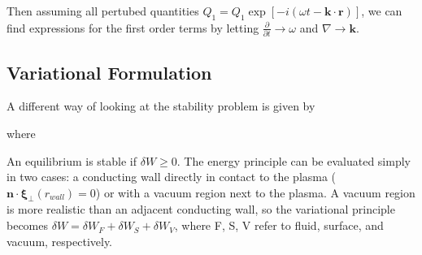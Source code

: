 \noindent Then assuming all pertubed quantities $Q_{1} = Q_{1} \exp \left[- i \left( \omega t - \textbf{k} \cdot \textbf{r} \right) \right]$, we can find expressions for the first order terms by letting $\frac{\partial}{\partial t} \rightarrow \omega $ and $\nabla \rightarrow \textbf{k}$. 

\subsection{Variational Formulation}

\noindent A different way of looking at the stability problem is given by 


\noindent where


\noindent An equilibrium is stable if $\delta W \geq 0$. The energy principle can be evaluated simply in two cases: a conducting wall directly in contact to the plasma ($\textbf{n} \cdot \boldsymbol{\xi}_{\bot}(r_{wall}) = 0$) or with a vacuum region next to the plasma. A vacuum region is more realistic than an adjacent conducting wall, so the variational principle becomes $ \delta W = \delta W_{F} + \delta W_{S} + \delta W_{V}$, where F, S, V refer to fluid, surface, and vacuum, respectively. 


